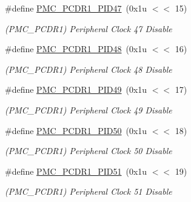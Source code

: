 \begin{DoxyCompactItemize}
\mbox{\label{group__SAMV71__PMC_ga3cc4b2e7791a7ea64566ff7b440994f1}} 
\#define \mbox{\hyperlink{group__SAMV71__PMC_ga3cc4b2e7791a7ea64566ff7b440994f1}{P\+M\+C\+\_\+\+P\+C\+D\+R1\+\_\+\+P\+I\+D47}}~(0x1u $<$$<$ 15)
\begin{DoxyCompactList}\small\item\em (P\+M\+C\+\_\+\+P\+C\+D\+R1) Peripheral Clock 47 Disable \end{DoxyCompactList}\item 
\mbox{\label{group__SAMV71__PMC_ga7f62bb05429b3a59e986799ab0e41e35}} 
\#define \mbox{\hyperlink{group__SAMV71__PMC_ga7f62bb05429b3a59e986799ab0e41e35}{P\+M\+C\+\_\+\+P\+C\+D\+R1\+\_\+\+P\+I\+D48}}~(0x1u $<$$<$ 16)
\begin{DoxyCompactList}\small\item\em (P\+M\+C\+\_\+\+P\+C\+D\+R1) Peripheral Clock 48 Disable \end{DoxyCompactList}\item 
\mbox{\label{group__SAMV71__PMC_gacdeac0f755374592760006417379d589}} 
\#define \mbox{\hyperlink{group__SAMV71__PMC_gacdeac0f755374592760006417379d589}{P\+M\+C\+\_\+\+P\+C\+D\+R1\+\_\+\+P\+I\+D49}}~(0x1u $<$$<$ 17)
\begin{DoxyCompactList}\small\item\em (P\+M\+C\+\_\+\+P\+C\+D\+R1) Peripheral Clock 49 Disable \end{DoxyCompactList}\item 
\mbox{\label{group__SAMV71__PMC_gae06b0c5224137b0fe2386637f32a2ec1}} 
\#define \mbox{\hyperlink{group__SAMV71__PMC_gae06b0c5224137b0fe2386637f32a2ec1}{P\+M\+C\+\_\+\+P\+C\+D\+R1\+\_\+\+P\+I\+D50}}~(0x1u $<$$<$ 18)
\begin{DoxyCompactList}\small\item\em (P\+M\+C\+\_\+\+P\+C\+D\+R1) Peripheral Clock 50 Disable \end{DoxyCompactList}\item 
\mbox{\label{group__SAMV71__PMC_ga68543bfbfe3db34ff6747473419ef92d}} 
\#define \mbox{\hyperlink{group__SAMV71__PMC_ga68543bfbfe3db34ff6747473419ef92d}{P\+M\+C\+\_\+\+P\+C\+D\+R1\+\_\+\+P\+I\+D51}}~(0x1u $<$$<$ 19)
\begin{DoxyCompactList}\small\item\em (P\+M\+C\+\_\+\+P\+C\+D\+R1) Peripheral Clock 51 Disable \end{DoxyCompactList}\item 
$$
\end{DoxyCompactItemize}
